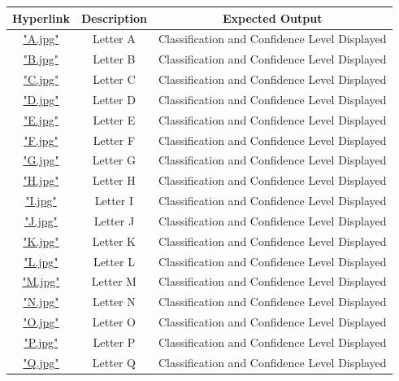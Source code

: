 \documentclass[12pt, titlepage]{article}
\begin{document}
\begin{table}[h!]
  \centering
  \begin{tabular}{|c|c|c|}
    \hline
    \textbf{Hyperlink} & \textbf{Description} & \textbf{Expected Output} \\ \hline
    \hyperref[A.jpg]{"A.jpg"} & Letter A & Classification and Confidence Level Displayed\\ \hline
    \hyperref[B.jpg]{"B.jpg"} & Letter B & Classification and Confidence Level Displayed\\ \hline
    \hyperref[C.jpg]{"C.jpg"} & Letter C & Classification and Confidence Level Displayed\\ \hline
    \hyperref[D.jpg]{"D.jpg"} & Letter D & Classification and Confidence Level Displayed\\ \hline
    \hyperref[E.jpg]{"E.jpg"} & Letter E & Classification and Confidence Level Displayed\\ \hline
    \hyperref[F.jpg]{"F.jpg"} & Letter F & Classification and Confidence Level Displayed\\ \hline
    \hyperref[G.jpg]{"G.jpg"} & Letter G & Classification and Confidence Level Displayed\\ \hline
    \hyperref[H.jpg]{"H.jpg"} & Letter H & Classification and Confidence Level Displayed\\ \hline
    \hyperref[I.jpg]{"I.jpg"} & Letter I & Classification and Confidence Level Displayed\\ \hline
    \hyperref[J.jpg]{"J.jpg"} & Letter J & Classification and Confidence Level Displayed\\ \hline
    \hyperref[K.jpg]{"K.jpg"} & Letter K & Classification and Confidence Level Displayed\\ \hline
    \hyperref[L.jpg]{"L.jpg"} & Letter L & Classification and Confidence Level Displayed\\ \hline
    \hyperref[M.jpg]{"M.jpg"} & Letter M & Classification and Confidence Level Displayed\\ \hline
    \hyperref[N.jpg]{"N.jpg"} & Letter N & Classification and Confidence Level Displayed\\ \hline
    \hyperref[O.jpg]{"O.jpg"} & Letter O & Classification and Confidence Level Displayed\\ \hline
    \hyperref[P.jpg]{"P.jpg"} & Letter P & Classification and Confidence Level Displayed\\ \hline
    \hyperref[Q.jpg]{"Q.jpg"} & Letter Q & Classification and Confidence Level Displayed\\ \hline

\end{tabular}
\end{table}
\end{document}
